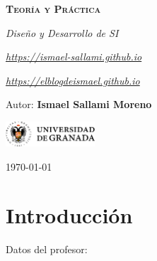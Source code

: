 \documentclass[12pt]{report} %
\begin{document}
\begin{titlepage}
    \begin{center}
        \vspace*{2cm}
        
        {\Huge \bfseries\scshape Teoría y Práctica \par}
        \vspace{0.5cm}
        {\Large \itshape Diseño y Desarrollo de SI \par}
        \vspace{0.5cm}
        {\small \itshape \href{https://ismael-sallami.github.io}{https://ismael-sallami.github.io} \par}
        {\small \itshape \href{https://elblogdeismael.github.io}{https://elblogdeismael.github.io} \par}


        \vfill
        
        {\LARGE Autor: \textbf{Ismael Sallami Moreno} \par}
        \vspace{0.3cm}
        
        \vspace{1cm}
        \includegraphics[width=0.25\textwidth]{../../../extraFiles/img/ugr.png} %
        \vspace{1cm}
        
        {\large \today}
    \end{center}
    
    \restoregeometry
\end{titlepage}


\thispagestyle{empty} %
\clearpage

\tableofcontents
\thispagestyle{empty} %
\clearpage

\hypertarget{introducciuxf3n}{%
\chapter{Introducción}\label{introducciuxf3n}}

Datos del profesor:
\end{document}

